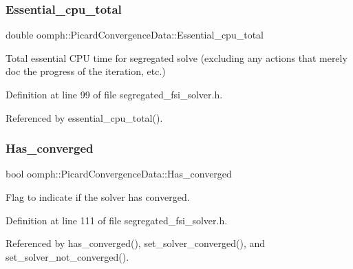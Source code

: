 \subsubsection{\texorpdfstring{Essential\+\_\+cpu\+\_\+total}{Essential\_cpu\_total}}
{\footnotesize\ttfamily double oomph\+::\+Picard\+Convergence\+Data\+::\+Essential\+\_\+cpu\+\_\+total\hspace{0.3cm}{\ttfamily [private]}}



Total essential C\+PU time for segregated solve (excluding any actions that merely doc the progress of the iteration, etc.) 



Definition at line 99 of file segregated\+\_\+fsi\+\_\+solver.\+h.



Referenced by essential\+\_\+cpu\+\_\+total().

\mbox{\label{classoomph_1_1PicardConvergenceData_a9f8602cce0f1e001f94f125e9278cc78}} 
\subsubsection{\texorpdfstring{Has\+\_\+converged}{Has\_converged}}
{\footnotesize\ttfamily bool oomph\+::\+Picard\+Convergence\+Data\+::\+Has\+\_\+converged\hspace{0.3cm}{\ttfamily [private]}}



Flag to indicate if the solver has converged. 



Definition at line 111 of file segregated\+\_\+fsi\+\_\+solver.\+h.



Referenced by has\+\_\+converged(), set\+\_\+solver\+\_\+converged(), and set\+\_\+solver\+\_\+not\+\_\+converged().

\mbox{\label{classoomph_1_1PicardConvergenceData_ac288000c0ccc529a43cf98dd9a6ef85c}} 

